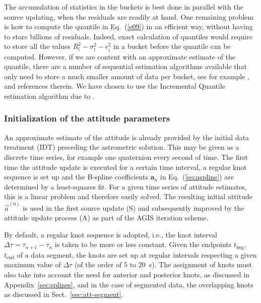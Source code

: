 \documentclass[structabstract]{aa}
\newcommand{\quat}[1]{\mathbf{#1}}
\begin{document}
The accumulation of statistics in the buckets is best done in parallel 
with the source updating, when the residuals are readily at hand.  
One remaining problem is how to compute the quantile in Eq.~(\ref{e09})
in an efficient way, without having to store billions of residuals. Indeed,
exact calculation of quantiles would require to store all the values 
$R_l^2-\sigma_l^2-\epsilon_i^2$ in a bucket before the quantile 
can be computed. However, if we are content
with an approximate estimate of the quantile, there are a number of
sequential estimation algorithms available that only need to store a
much smaller amount of data per bucket, see for example 
\citet{greenwald+01}, \citet{gilbert+02} and references therein.
We have chosen to use the Incremental Quantile estimation algorithm
due to \citet{chambers+06}. 

 
\subsubsection{Initialization of the attitude parameters}\label{sec:attInit}

An approximate estimate of the attitude is already provided by the
initial data treatment (IDT) preceding the astrometric solution.
This may be given as a discrete time series, for example one quaternion
every second of time. The first time the attitude update is executed
for a certain time interval, a regular knot sequence is set up and the
B-spline coefficients $\quat{a}_n$ in Eq.~(\ref{eq:qspline}) are determined
by a least-squares fit. For a given time series of attitude estimates,
this is a linear problem and therefore easily solved. The resulting initial
attitude $\vec{a}^{(0)}$ is used in the first source update (S) and
subsequently improved by the attitude update process (A) as part of the
AGIS iteration scheme.

By default, a regular knot sequence is adopted, i.e., the knot interval
$\Delta\tau=\tau_{n+1}-\tau_n$ is taken to be more or less constant.
Given the endpoints $t_\text{beg}$, $t_\text{end}$ of a data segment,
the knots are set up at regular intervals respecting a given maximum
value of $\Delta\tau$ (of the order of 5 to 20~s). The assignment of knots
must also take into account the need for anterior and posterior knots,
as discussed in Appendix~\ref{sec:splines}, and in the case of
segmented data, the overlapping knots as
discussed in Sect.~\ref{sec:att-segment}.
\end{document}
